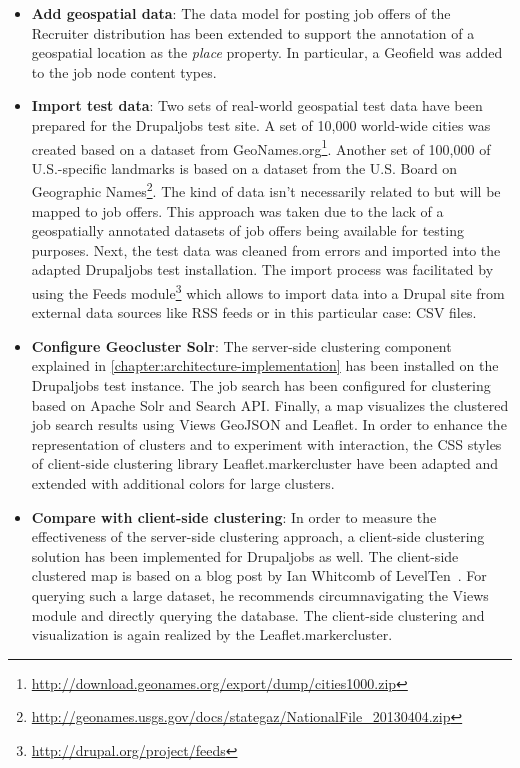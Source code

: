 \begin{itemize}

\item \textbf{Add geospatial data}: The data model for posting job offers of the Recruiter distribution has been extended to support the annotation of a geospatial location as the \textit{place} property. In particular, a Geofield was added to the job node content types.

\item \textbf{Import test data}: Two sets of real-world geospatial test data have been prepared for the Drupaljobs test site. A set of 10,000 world-wide cities was created based on a dataset from GeoNames.org\footnote{\url{http://download.geonames.org/export/dump/cities1000.zip}}. Another set of 100,000 of U.S.-specific landmarks is based on a dataset from the U.S. Board on Geographic Names\footnote{\url{http://geonames.usgs.gov/docs/stategaz/NationalFile_20130404.zip}}. The kind of data isn't necessarily related to but will be mapped to job offers. This approach was taken due to the lack of a geospatially annotated datasets of job offers being available for testing purposes. Next, the test data was cleaned from errors and imported into the adapted Drupaljobs test installation. The import process was facilitated by using the Feeds module\footnote{\url{http://drupal.org/project/feeds}} which allows to import data into a Drupal site from external data sources like RSS feeds or in this particular case: CSV files.

\item \textbf{Configure Geocluster Solr}: The server-side clustering component explained in \ref{chapter:architecture-implementation} has been installed on the Drupaljobs test instance. The job search has been configured for clustering based on Apache Solr and Search API. Finally, a map visualizes the clustered job search results using Views GeoJSON and Leaflet. In order to enhance the representation of clusters and to experiment with interaction, the CSS styles of client-side clustering library Leaflet.markercluster have been adapted and extended with additional colors for large clusters.

\item \textbf{Compare with client-side clustering}: In order to measure the effectiveness of the server-side clustering approach, a client-side clustering solution has been implemented for Drupaljobs as well. The client-side clustered map is based on a blog post by Ian Whitcomb of LevelTen~\cite{blog:leaflet-made-to-order}. For querying such a large dataset, he recommends circumnavigating the Views module and directly querying the database. The client-side clustering and visualization is again realized by the Leaflet.markercluster.

\end{itemize}

